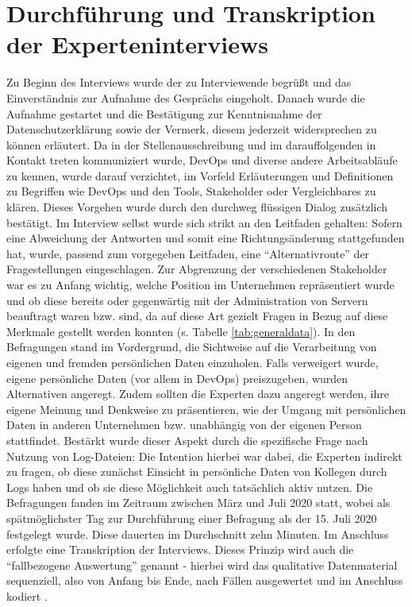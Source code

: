 \section{Durchführung und Transkription der Experteninterviews}
Zu Beginn des Interviews wurde der zu Interviewende begrüßt und das Einverständnis zur Aufnahme des Gesprächs eingeholt. Danach wurde die Aufnahme gestartet und die Bestätigung zur Kenntnisnahme der Datenschutzerklärung 
sowie der Vermerk, diesem jederzeit widersprechen zu können erläutert. Da in der Stellenausschreibung und im darauffolgenden in Kontakt treten kommuniziert wurde, DevOps und diverse andere Arbeitsabläufe zu kennen, wurde 
darauf verzichtet, im Vorfeld Erläuterungen und Definitionen zu Begriffen wie DevOps und den Tools, Stakeholder oder Vergleichbares zu klären. Dieses Vorgehen wurde durch den durchweg flüssigen Dialog zusätzlich bestätigt.
Im Interview selbst wurde sich strikt an den Leitfaden gehalten: Sofern eine Abweichung der Antworten und somit eine Richtungsänderung stattgefunden hat, wurde, passend zum vorgegeben Leitfaden, eine \enquote{Alternativroute}
der Fragestellungen eingeschlagen. \newline \newline
Zur Abgrenzung der verschiedenen Stakeholder war es zu Anfang wichtig, welche Position im Unternehmen repräsentiert wurde und ob diese bereits oder gegenwärtig mit der Administration
von Servern beauftragt waren bzw. sind, da auf diese Art gezielt Fragen in Bezug auf diese Merkmale gestellt werden konnten (s. Tabelle \ref{tab:generaldata}). In den Befragungen stand im Vordergrund, die Sichtweise auf die Verarbeitung von eigenen und fremden
persönlichen Daten einzuholen. Falls verweigert wurde, eigene persönliche Daten (vor allem in DevOps) preiszugeben, wurden Alternativen angeregt. Zudem sollten die Experten dazu angeregt werden, ihre eigene Meinung und Denkweise
zu präsentieren, wie der Umgang mit persönlichen Daten in anderen Unternehmen bzw. unabhängig von der eigenen Person stattfindet. Bestärkt wurde dieser Aspekt durch die spezifische Frage nach Nutzung von Log-Dateien: Die Intention
hierbei war dabei, die Experten indirekt zu fragen, ob diese zunächst Einsicht in persönliche Daten von Kollegen durch Logs haben und ob sie diese Möglichkeit auch tatsächlich aktiv nutzen. 
\newline \newline
Die Befragungen fanden im Zeitraum zwischen März und Juli 2020 statt, wobei als spätmöglichster Tag zur Durchführung einer Befragung als der 15. Juli 2020 festgelegt wurde. Diese dauerten im Durchschnitt zehn Minuten. 
Im Anschluss erfolgte eine Transkription der Interviews. Dieses Prinzip wird auch die \enquote{fallbezogene Auswertung} \cite{Doring:2014aa} genannt - hierbei wird das qualitative Datenmaterial sequenziell, also von Anfang bis
Ende, nach Fällen ausgewertet und im Anschluss kodiert \cite{Doring:2014aa}.

